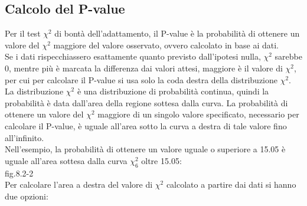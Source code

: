 \documentclass[drafts, 10pt]{book}
\begin{document}
\subsection{Calcolo del P-value}
Per il test $\chi^2$ di bontà dell'adattamento, il P-value è la probabilità di ottenere un valore del $\chi^2$ maggiore del valore osservato, ovvero calcolato in base ai dati.
\\
Se i dati rispecchiassero esattamente quanto previsto dall'ipotesi nulla, $\chi^2$ sarebbe 0, mentre più è marcata la differenza dai valori attesi, maggiore è il valore di $\chi^2$, per cui per calcolare il P-value si usa solo la coda destra della distribuzione $\chi^2$.
\\
La distribuzione $\chi^2$ è una distribuzione di probabilità continua, quindi la probabilità è data dall'area della regione sottesa dalla curva. La probabilità di ottenere un valore del $\chi^2$ maggiore di un singolo valore specificato, necessario per calcolare il P-value, è uguale all'area sotto la curva a destra di tale valore fino all'infinito.
\\
Nell'esempio, la probabilità di ottenere un valore uguale o superiore a 15.05 è uguale all'area sottesa dalla curva $\chi^2_6$ oltre 15.05:
\\
fig.8.2-2 \label{fig8.2-2} %
\\
Per calcolare l'area a destra del valore di $\chi^2$ calcolato a partire dai dati si hanno due opzioni:
\end{document}

